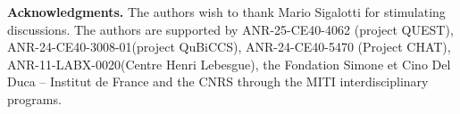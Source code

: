\documentclass[a4paper]{article}
\theoremstyle{plain}
\begin{document}
\textbf{Acknowledgments.} The authors wish to thank Mario Sigalotti for stimulating discussions. The authors are supported by 
ANR-25-CE40-4062 (project QUEST),
ANR-24-CE40-3008-01\newline(project QuBiCCS),
ANR-24-CE40-5470 (Project CHAT),
ANR-11-LABX-0020\newline(Centre Henri Lebesgue),
the Fondation Simone et Cino Del Duca – Institut de France and
the CNRS through the MITI interdisciplinary programs.








%

\end{document}

